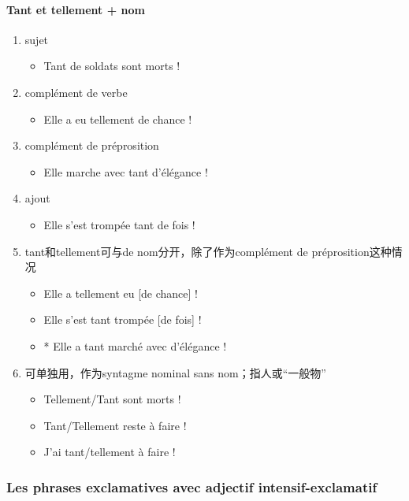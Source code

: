 \documentclass[UTF8]{report}
\begin{document}
\paragraph{Tant et tellement + nom}
\begin{enumerate}
    \item sujet
    \begin{itemize}
        \item Tant de soldats sont morts !
    \end{itemize}
    \item complément de verbe
    \begin{itemize}
        \item Elle a eu tellement de chance !
    \end{itemize}
    \item complément de préprosition
    \begin{itemize}
        \item Elle marche avec tant d’élégance !
    \end{itemize}
    \item ajout
    \begin{itemize}
        \item Elle s’est trompée tant de fois !
    \end{itemize}
    \item tant和tellement可与de nom分开，除了作为complément de préprosition这种情况
    \begin{itemize}
        \item Elle a tellement eu [de chance] !
        \item Elle s’est tant trompée [de fois] !
        \item * Elle a tant marché avec d’élégance !
    \end{itemize}
    \item 可单独用，作为syntagme nominal sans nom；指人或“一般物”
    \begin{itemize}
        \item Tellement/Tant sont morts !
        \item Tant/Tellement reste à faire !
        \item J’ai tant/tellement à faire !
    \end{itemize}
\end{enumerate}

\subsubsection{Les phrases exclamatives avec adjectif intensif-exclamatif}
\end{document}
